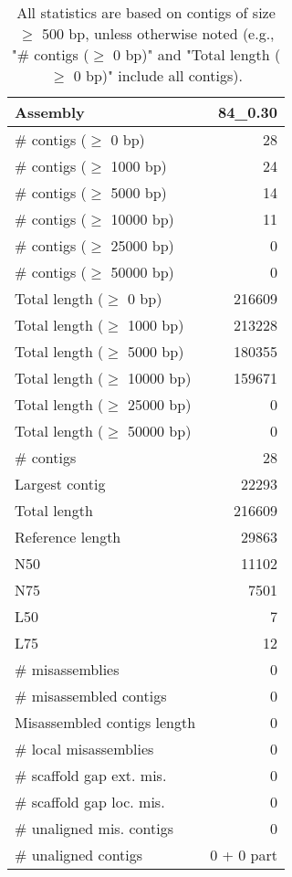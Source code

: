 \documentclass[12pt,a4paper]{article}
\begin{document}
\begin{table}[ht]
\begin{center}
\caption{All statistics are based on contigs of size $\geq$ 500 bp, unless otherwise noted (e.g., "\# contigs ($\geq$ 0 bp)" and "Total length ($\geq$ 0 bp)" include all contigs).}
\begin{tabular}{|l*{1}{|r}|}
\hline
Assembly & 84\_0.30 \\ \hline
\# contigs ($\geq$ 0 bp) & 28 \\ \hline
\# contigs ($\geq$ 1000 bp) & 24 \\ \hline
\# contigs ($\geq$ 5000 bp) & 14 \\ \hline
\# contigs ($\geq$ 10000 bp) & 11 \\ \hline
\# contigs ($\geq$ 25000 bp) & 0 \\ \hline
\# contigs ($\geq$ 50000 bp) & 0 \\ \hline
Total length ($\geq$ 0 bp) & 216609 \\ \hline
Total length ($\geq$ 1000 bp) & 213228 \\ \hline
Total length ($\geq$ 5000 bp) & 180355 \\ \hline
Total length ($\geq$ 10000 bp) & 159671 \\ \hline
Total length ($\geq$ 25000 bp) & 0 \\ \hline
Total length ($\geq$ 50000 bp) & 0 \\ \hline
\# contigs & 28 \\ \hline
Largest contig & 22293 \\ \hline
Total length & 216609 \\ \hline
Reference length & 29863 \\ \hline
N50 & 11102 \\ \hline
N75 & 7501 \\ \hline
L50 & 7 \\ \hline
L75 & 12 \\ \hline
\# misassemblies & 0 \\ \hline
\# misassembled contigs & 0 \\ \hline
Misassembled contigs length & 0 \\ \hline
\# local misassemblies & 0 \\ \hline
\# scaffold gap ext. mis. & 0 \\ \hline
\# scaffold gap loc. mis. & 0 \\ \hline
\# unaligned mis. contigs & 0 \\ \hline
\# unaligned contigs & 0 + 0 part \\ \hline

\end{tabular}
\end{center}
\end{table}
\end{document}
